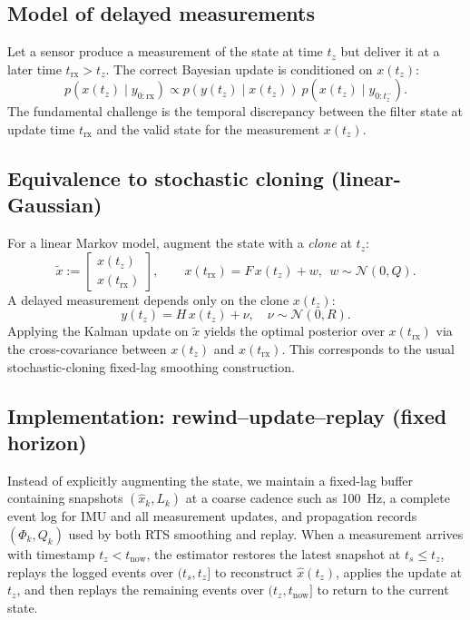 \documentclass[10pt]{article}
\newcommand{\calN}{\mathcal{N}}
\newcommand{\defeq}{\mathrel{:=}}
\begin{document}
\subsection{Model of delayed measurements}
Let a sensor produce a measurement of the state at time $t_z$ but deliver it at a later time $t_{\text{rx}}>t_z$.
The correct Bayesian update is conditioned on $x(t_z)$:
\begin{equation}
  p(x(t_z)\mid y_{0:\text{rx}}) \propto p(y(t_z)\mid x(t_z))\ p(x(t_z)\mid y_{0:t_z^-}).
\end{equation}
The fundamental challenge is the temporal discrepancy between the filter state at update time $t_{\text{rx}}$ and the valid state for the measurement $x(t_z)$.

\subsection{Equivalence to stochastic cloning (linear-Gaussian)}
For a linear Markov model, augment the state with a \emph{clone} at $t_z$:
\begin{equation}
  \tilde x \defeq \begin{bmatrix} x(t_z)\\ x(t_{\text{rx}})\end{bmatrix},\qquad
  x(t_{\text{rx}})=F\,x(t_z)+w,\ \ w\sim \calN(0,Q).
\end{equation}
A delayed measurement depends only on the clone $x(t_z)$:
\begin{equation}
  y(t_z) = H\,x(t_z)+\nu,\quad \nu\sim\calN(0,R).
\end{equation}
Applying the Kalman update on $\tilde x$ yields the optimal posterior over $x(t_{\text{rx}})$ via the cross-covariance between $x(t_z)$ and $x(t_{\text{rx}})$.
This corresponds to the usual stochastic-cloning fixed-lag smoothing construction.

\subsection{Implementation: rewind--update--replay (fixed horizon)}
Instead of explicitly augmenting the state, we maintain a fixed-lag buffer containing snapshots $(\hat x_k, L_k)$ at a coarse cadence such as \SI{100}{Hz}, a complete event log for IMU and all measurement updates, and propagation records $(\Phi_k,Q_k)$ used by both RTS smoothing and replay. When a measurement arrives with timestamp $t_z < t_{\text{now}}$, the estimator restores the latest snapshot at $t_s\le t_z$, replays the logged events over $(t_s,t_z]$ to reconstruct $\hat x(t_z)$, applies the update at $t_z$, and then replays the remaining events over $(t_z,t_{\text{now}}]$ to return to the current state.
\end{document}
